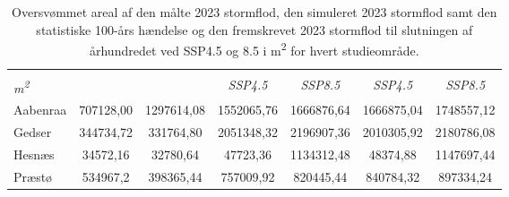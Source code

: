 \begin{table}[H]
\centering
\renewcommand{\arraystretch}{1.5} 
\begin{threeparttable}
\caption{Oversvømmet areal af den målte 2023 stormflod, den simuleret 2023 stormflod samt den statistiske 100-års hændelse og den fremskrevet 2023 stormflod til slutningen af århundredet ved SSP4.5 og 8.5 i m\textsuperscript{2} for hvert studieområde.}
\begin{tabular}{@{} l S[table-format=7.2, output-decimal-marker={,}] 
                    S[table-format=7.2, output-decimal-marker={,}] 
                    S[table-format=7.2, output-decimal-marker={,}] 
                    S[table-format=7.2, output-decimal-marker={,}] 
                    S[table-format=7.2, output-decimal-marker={,}] 
                    S[table-format=7.2, output-decimal-marker={,}] @{}} 
\toprule
&  
&  
&  
&  \\ 
\cmidrule(l){4-5} \cmidrule(l){6-7}
{\textit{m\textsuperscript{2}}} & & & {\textit{SSP4.5}} & {\textit{SSP8.5}} & {\textit{SSP4.5}} & {\textit{SSP8.5}} \\
\midrule
  Aabenraa & 707128,00 & 1297614,08 & 1552065,76 & 1666876,64 & 1666875,04 & 1748557,12 \\
  Gedser & 344734,72 & 331764,80 & 2051348,32 & 2196907,36 & 2010305,92 & 2180786,08 \\ 
  Hesnæs & 34572,16 & 32780,64 & 47723,36 & 1134312,48 & 48374,88 & 1147697,44 \\
  Præstø & 534967,2 & 398365,44 & 757009,92 & 820445,44 & 840784,32 & 897334,24 \\
\bottomrule
\end{tabular}
\label{Tabel: Oversvømmet arealer af stormfloder}
\end{threeparttable}
\end{table}

 